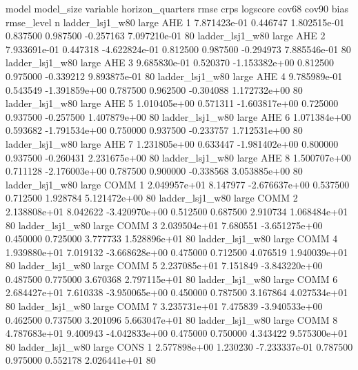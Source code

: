               model model_size variable  horizon_quarters         rmse          crps      logscore    cov68    cov90           bias   rmse_level  n
    ladder_lsj1_w80      large      AHE                 1 7.871423e-01      0.446747  1.802515e-01 0.837500 0.987500      -0.257163 7.097210e-01 80
    ladder_lsj1_w80      large      AHE                 2 7.933691e-01      0.447318 -4.622824e-01 0.812500 0.987500      -0.294973 7.885546e-01 80
    ladder_lsj1_w80      large      AHE                 3 9.685830e-01      0.520370 -1.153382e+00 0.812500 0.975000      -0.339212 9.893875e-01 80
    ladder_lsj1_w80      large      AHE                 4 9.785989e-01      0.543549 -1.391859e+00 0.787500 0.962500      -0.304088 1.172732e+00 80
    ladder_lsj1_w80      large      AHE                 5 1.010405e+00      0.571311 -1.603817e+00 0.725000 0.937500      -0.257500 1.407879e+00 80
    ladder_lsj1_w80      large      AHE                 6 1.071384e+00      0.593682 -1.791534e+00 0.750000 0.937500      -0.233757 1.712531e+00 80
    ladder_lsj1_w80      large      AHE                 7 1.231805e+00      0.633447 -1.981402e+00 0.800000 0.937500      -0.260431 2.231675e+00 80
    ladder_lsj1_w80      large      AHE                 8 1.500707e+00      0.711128 -2.176003e+00 0.787500 0.900000      -0.338568 3.053885e+00 80
    ladder_lsj1_w80      large     COMM                 1 2.049957e+01      8.147977 -2.676637e+00 0.537500 0.712500       1.928784 5.121472e+00 80
    ladder_lsj1_w80      large     COMM                 2 2.138808e+01      8.042622 -3.420970e+00 0.512500 0.687500       2.910734 1.068484e+01 80
    ladder_lsj1_w80      large     COMM                 3 2.039504e+01      7.680551 -3.651275e+00 0.450000 0.725000       3.777733 1.528896e+01 80
    ladder_lsj1_w80      large     COMM                 4 1.939880e+01      7.019132 -3.668628e+00 0.475000 0.712500       4.076519 1.940039e+01 80
    ladder_lsj1_w80      large     COMM                 5 2.237085e+01      7.151849 -3.843220e+00 0.487500 0.775000       3.670368 2.797115e+01 80
    ladder_lsj1_w80      large     COMM                 6 2.684427e+01      7.610338 -3.950065e+00 0.450000 0.787500       3.167864 4.027534e+01 80
    ladder_lsj1_w80      large     COMM                 7 3.235731e+01      7.475839 -3.940533e+00 0.462500 0.737500       3.201096 5.663047e+01 80
    ladder_lsj1_w80      large     COMM                 8 4.787683e+01      9.400943 -4.042833e+00 0.475000 0.750000       4.343422 9.575300e+01 80
    ladder_lsj1_w80      large     CONS                 1 2.577898e+00      1.230230 -7.233337e-01 0.787500 0.975000       0.552178 2.026441e+01 80
